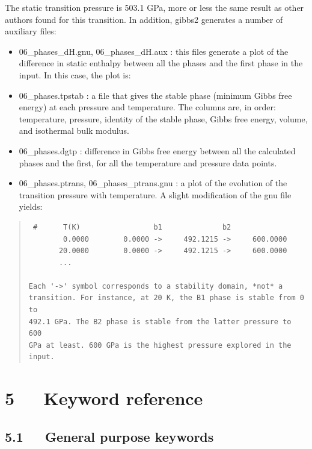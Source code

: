 \documentclass[a4paper]{article}
\begin{document}
The static transition pressure is 503.1 GPa, more or less the same
result as other authors found for this transition. In addition, gibbs2
generates a number of auxiliary files:

\begin{itemize}
\item 06\_phases\_dH.gnu, 06\_phases\_dH.aux : this files generate a plot of
the difference in static enthalpy between all the phases and the
first phase in the input. In this case, the plot is:
\end{itemize}

\begin{itemize}
\item 06\_phases.tpstab : a file that gives the stable phase (minimum Gibbs
free energy) at each pressure and temperature. The columns are, in
order: temperature, pressure, identity of the stable phase, Gibbs
free energy, volume, and isothermal bulk modulus.

\item 06\_phases.dgtp : difference in Gibbs free energy between all the
calculated phases and the first, for all the temperature and
pressure data points.

\item 06\_phases.ptrans, 06\_phases\_ptrans.gnu : a plot of the evolution of
the transition pressure with temperature. A slight modification of
the gnu file yields:
\end{itemize}

\begin{quote}
\begin{verbatim}
 #      T(K)                 b1              b2
        0.0000        0.0000 ->     492.1215 ->     600.0000
       20.0000        0.0000 ->     492.1215 ->     600.0000
       ...

Each '->' symbol corresponds to a stability domain, *not* a
transition. For instance, at 20 K, the B1 phase is stable from 0 to
492.1 GPa. The B2 phase is stable from the latter pressure to 600
GPa at least. 600 GPa is the highest pressure explored in the input.
\end{verbatim}
\end{quote}


\section{5   Keyword reference%
  \label{keyword-reference}%
}


\subsection{5.1   General purpose keywords%
  \label{general-purpose-keywords}%
}
\end{document}
